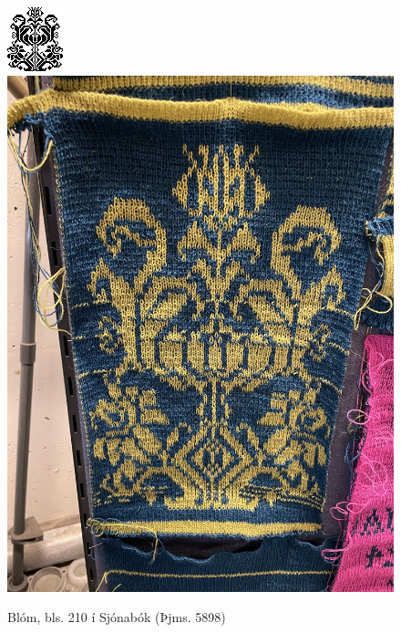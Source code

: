\begin{figure}[p]
    \centering
    \includegraphics[height=.20\textheight]{myndir/thjms5898_210.png}
    \hspace{24pt}
    \includegraphics[height=.25\textheight]{myndir/flower.jpg}
    \caption{Blóm, bls. 210 í Sjónabók (Þjms. 5898)}
    \label{fig:flower}
\end{figure}

